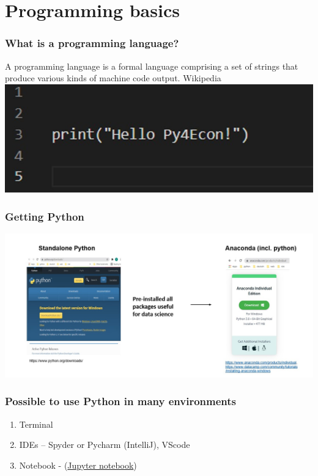 \documentclass{beamer}
\begin{document}
\section{Programming basics} 
\frame{\tableofcontents[currentsection]}

\begin{frame}
    \frametitle{What is a programming language?}
    A programming language is a formal language comprising a set of strings 
    that produce various kinds of machine code output.
    Wikipedia \\
    \centering
    \includegraphics[scale = 0.3]{figures/hello.jpg}   
\end{frame}


\begin{frame}
    \frametitle{Getting Python}
    \centering
    \includegraphics[scale = 0.35]{figures/getpython.jpg}
\end{frame}

\begin{frame}
    \frametitle{Possible to use Python in many environments}

    \begin{enumerate}
        \item Terminal
        \item IDEs – Spyder or Pycharm (IntelliJ), VScode
        \item Notebook -  (\href{https://github.com/susanli2016/Machine-Learning-with-Python}
        {Jupyter notebook})
    \end{enumerate}
\end{frame}
\end{document}
